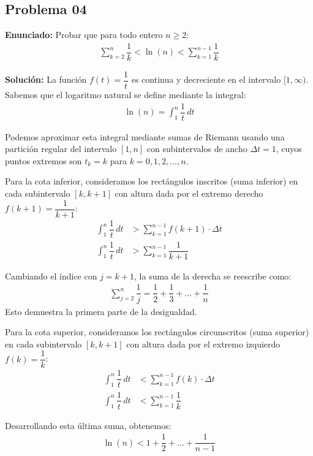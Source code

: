 \subsection*{Problema 04}

\textbf{Enunciado:}
Probar que para todo entero $n \ge 2$:
\begin{align*}
\sum_{k=2}^{n} \dfrac{1}{k} < \ln(n) < \sum_{k=1}^{n-1} \dfrac{1}{k}
\end{align*}

\textbf{Solución:}
La función $f(t) = \dfrac{1}{t}$ es continua y decreciente en el intervalo $[1, \infty)$. 
Sabemos que el logaritmo natural se define mediante la integral:
\begin{align*}
\ln(n) = \int_{1}^{n} \dfrac{1}{t} \, dt
\end{align*}

Podemos aproximar esta integral mediante sumas de Riemann usando una partición regular del intervalo $[1, n]$ con subintervalos de ancho $\Delta t = 1$, cuyos puntos extremos son $t_k = k$ para $k = 0, 1, 2, \dots, n$.

Para la cota inferior, consideramos los rectángulos inscritos (suma inferior) en cada subintervalo $[k, k+1]$ con altura dada por el extremo derecho $f(k+1) = \dfrac{1}{k+1}$:
\begin{align*}
\int_{1}^{n} \dfrac{1}{t} \, dt &> \sum_{k=1}^{n-1} f(k+1) \cdot \Delta t \\
\int_{1}^{n} \dfrac{1}{t} \, dt &> \sum_{k=1}^{n-1} \dfrac{1}{k+1}
\end{align*}

Cambiando el índice con $j = k+1$, la suma de la derecha se reescribe como:
\begin{align*}
\sum_{j=2}^{n} \dfrac{1}{j} = \dfrac{1}{2} + \dfrac{1}{3} + \dots + \dfrac{1}{n}
\end{align*}
Esto demuestra la primera parte de la desigualdad.

Para la cota superior, consideramos los rectángulos circunscritos (suma superior) en cada subintervalo $[k, k+1]$ con altura dada por el extremo izquierdo $f(k) = \dfrac{1}{k}$:
\begin{align*}
\int_{1}^{n} \dfrac{1}{t} \, dt &< \sum_{k=1}^{n-1} f(k) \cdot \Delta t \\
\int_{1}^{n} \dfrac{1}{t} \, dt &< \sum_{k=1}^{n-1} \dfrac{1}{k}
\end{align*}

Desarrollando esta última suma, obtenemos:
\begin{align*}
\ln(n) < 1 + \dfrac{1}{2} + \dots + \dfrac{1}{n-1}
\end{align*}


